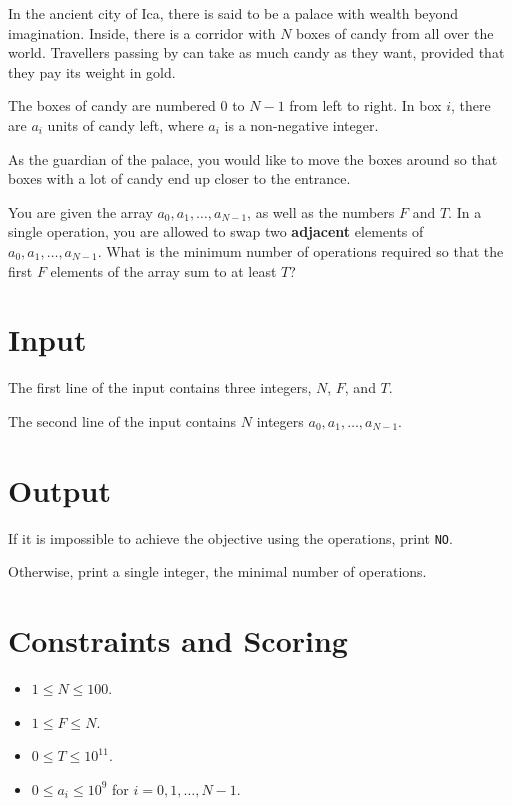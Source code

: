 In the ancient city of Ica, there is said to be a palace with wealth beyond imagination. Inside, 
there is a corridor with $N$ boxes of candy from all over the world. Travellers passing by 
can take as much candy as they want, provided that they pay its weight in gold.

The boxes of candy are numbered $0$ to $N-1$ from left to right. In box $i$, there are $a_i$ units 
of candy left, where $a_i$ is a non-negative integer. 

As the guardian of the palace, you would like to move the boxes around so that boxes with a lot 
of candy end up closer to the entrance. 

You are given the array $a_0, a_1, \ldots, a_{N-1}$, as well as the numbers $F$ and $T$.
In a single operation, you are allowed to swap two \textbf{adjacent} elements of $a_0, a_1, \ldots, a_{N-1}$.
What is the minimum number of operations required so that the first $F$ elements of the array sum to at least $T$?

\section*{Input}

The first line of the input contains three integers, $N$, $F$, and $T$.

The second line of the input contains $N$ integers $a_0, a_1, \ldots, a_{N-1}$.

\section*{Output}

If it is impossible to achieve the objective using the operations, print \texttt{NO}.

Otherwise, print a single integer, the minimal number of operations.

\section*{Constraints and Scoring}

\noindent
\begin{itemize}
  \item $1 \le N \le 100$.
  \item $1 \le F \le N$.
  \item $0 \le T \le 10^{11}$.
  \item $0 \le a_i \le 10^9$ for $i = 0, 1, \ldots, N-1$.
\end{itemize}

